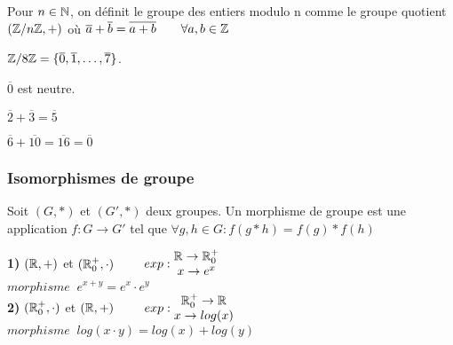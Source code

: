\begin{defn}
Pour $n\in \mathbb{N}$, on définit le groupe des entiers modulo n comme le groupe quotient $(\mathbb{Z}/n\mathbb{Z},+)$ où $\overline{a} + \overline{b} = \overline{a+b} \qquad \forall a,b \in \mathbb{Z}$
\end{defn}

\begin{exmp}
$\mathbb{Z}/8\mathbb{Z} = \{ \overline{0}, \overline{1}, \ldots, \overline{7} \}$.

\hspace{-0.55cm}$\overline{0}$ est neutre.

\hspace{-0.55cm}$\overline{2} + \overline{3} = \overline{5}$

\hspace{-0.55cm}$\overline{6} + \overline{10} = \overline{16} = \overline{0}$
\end{exmp}

\newpage

\subsubsection{Isomorphismes de groupe}

\begin{defn}
Soit $(G,*)$ et $({G}',*)$ deux groupes. Un morphisme de groupe est une application $f: G \rightarrow {G}'$ tel que $\forall g,h \in G: f(g*h) = f(g) * f(h)$
\end{defn}

\begin{exmp}
\textbf{1)} $(\mathbb{R},+)$ et $(\mathbb{R}^+_0,\cdot) \qquad$ $exp: \begin{matrix} \mathbb{R} \rightarrow \mathbb{R}^+_0\\ x \rightarrow e^x \end{matrix}$ \\

$morphisme \; \; e^{x+y} = e^x \cdot e^y$ \\

\hspace{-0.55cm}\textbf{2)}  $(\mathbb{R}^+_0,\cdot)$ et $(\mathbb{R},+) \qquad$ $exp: \begin{matrix} \mathbb{R}^+_0 \rightarrow \mathbb{R} \\ x \rightarrow log(x) \end{matrix}$ \\

$morphisme \; \; log(x\cdot y) = log(x) + log(y)$ \\
\end{exmp}

